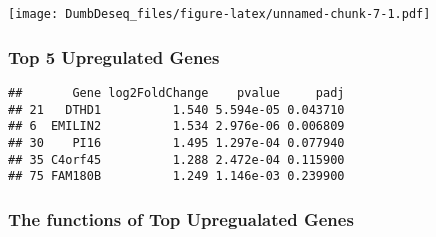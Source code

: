 \documentclass[
]{article}
\newenvironment{Shaded}{\begin{snugshade}}{\end{snugshade}}
\newcommand{\DecValTok}[1]{\textcolor[rgb]{0.00,0.00,0.81}{#1}}
\newcommand{\FloatTok}[1]{\textcolor[rgb]{0.00,0.00,0.81}{#1}}
\newcommand{\FunctionTok}[1]{\textcolor[rgb]{0.13,0.29,0.53}{\textbf{#1}}}
\newcommand{\NormalTok}[1]{#1}
\newcommand{\OtherTok}[1]{\textcolor[rgb]{0.56,0.35,0.01}{#1}}
\newcommand{\SpecialCharTok}[1]{\textcolor[rgb]{0.81,0.36,0.00}{\textbf{#1}}}
\begin{document}
\texttt{[image: DumbDeseq\_files/figure-latex/unnamed-chunk-7-1.pdf]}

\subsubsection{Top 5 Upregulated Genes}\label{top-5-upregulated-genes}

\begin{Shaded}
\end{Shaded}

\begin{verbatim}
##       Gene log2FoldChange    pvalue     padj
## 21   DTHD1          1.540 5.594e-05 0.043710
## 6  EMILIN2          1.534 2.976e-06 0.006809
## 30    PI16          1.495 1.297e-04 0.077940
## 35 C4orf45          1.288 2.472e-04 0.115900
## 75 FAM180B          1.249 1.146e-03 0.239900
\end{verbatim}

\subsubsection{The functions of Top Upregualated
Genes}\label{the-functions-of-top-upregualated-genes}
\end{document}
